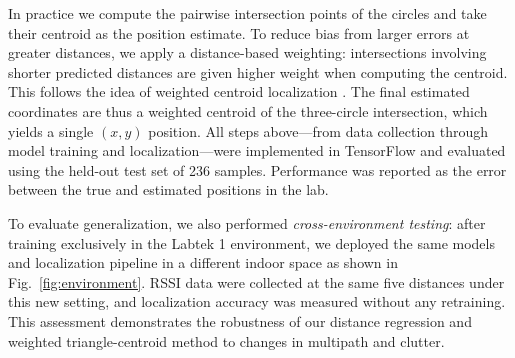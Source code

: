 In practice we compute the pairwise intersection points of the circles and take their centroid as the position estimate. To reduce bias from larger errors at greater distances, we apply a distance-based weighting: intersections involving shorter predicted distances are given higher weight when computing the centroid. This follows the idea of weighted centroid localization \cite{nagah2021enhanced}. The final estimated coordinates are thus a weighted centroid of the three-circle intersection, which yields a single $(x,y)$ position. All steps above—from data collection through model training and localization—were implemented in TensorFlow and evaluated using the held-out test set of 236 samples. Performance was reported as the error between the true and estimated positions in the lab.

To evaluate generalization, we also performed \emph{cross-environment testing}: after training exclusively in the Labtek 1 environment, we deployed the same models and localization pipeline in a different indoor space as shown in Fig.~\ref{fig:environment}. RSSI data were collected at the same five distances under this new setting, and localization accuracy was measured without any retraining. This assessment demonstrates the robustness of our distance regression and weighted triangle-centroid method to changes in multipath and clutter.
